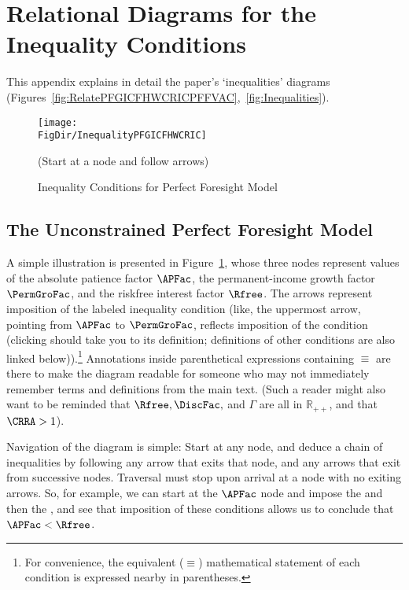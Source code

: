 \documentclass[\econtexRoot/BufferStockTheory]{subfiles}
\begin{document}
\hypertarget{ApndxConditionDiagrams}{}

\section{Relational Diagrams for the Inequality Conditions}\label{sec:ApndxConditionDiagrams}

This appendix explains in detail the paper's `inequalities' diagrams (Figures~\ref{fig:RelatePFGICFHWCRICPFFVAC},~\ref{fig:Inequalities}).

\hypertarget{InequalityPFGICFHWCRIC}{}
\begin{figure}
\centering
\texttt{[image: \\FigDir/InequalityPFGICFHWCRIC]}
\caption{Inequality Conditions for Perfect Foresight Model}
\centerline{ (Start at a node and follow arrows)}\label{fig:InequalityPFGICFHWCRIC}
\end{figure}

\subsection{The Unconstrained Perfect Foresight Model}

A simple illustration is presented in Figure~\ref{fig:InequalityPFGICFHWCRIC}, whose three nodes represent values of the absolute patience factor $\APFac$, the permanent-income growth factor $\PermGroFac$, and the riskfree interest factor $\Rfree$.  The arrows represent imposition of the labeled inequality condition  (like,  the uppermost arrow, pointing from {$\APFac$} to $\PermGroFac$, reflects imposition of the {\GICRaw} condition (clicking {\GICRaw} should take you to its definition; definitions of other conditions are also linked below)).\footnote{For convenience, the equivalent ($\equiv$) mathematical statement of each condition is expressed nearby in parentheses.}  Annotations inside parenthetical expressions containing $\equiv$ are there to make the diagram readable for someone who may not immediately remember terms and definitions from the main text.  (Such a reader might also want to be reminded that $\Rfree, \DiscFac, $ and $\Gamma$ are all in $\mathbb{R}_{++}$, and that $\CRRA>1$).

Navigation of the diagram is simple: Start at any node, and deduce a chain of inequalities by following any arrow that exits that node, and any arrows that exit from successive nodes.  Traversal must stop upon arrival at a node with no exiting arrows.  So, for example, we can start at the $\APFac$ node and impose the {\GICRaw} and then the {\FHWC}, and see that imposition of these conditions allows us to conclude that $\APFac < \Rfree$.
\end{document}
